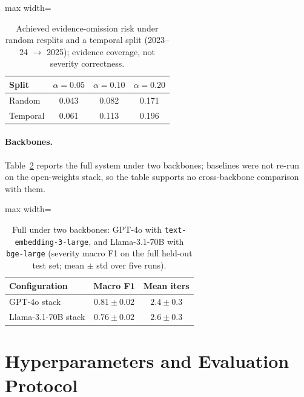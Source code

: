\begin{table}[h]
\centering
\small
\begin{adjustbox}{max width=\columnwidth}
\begin{tabular}{lccc}
\toprule
Split & $\alpha{=}0.05$ & $\alpha{=}0.10$ & $\alpha{=}0.20$ \\
\midrule
Random & 0.043 & 0.082 & 0.171 \\
Temporal & 0.061 & 0.113 & 0.196 \\
\bottomrule
\end{tabular}
\end{adjustbox}
\caption{Achieved evidence-omission risk under random resplits and a temporal split (2023--24 $\to$ 2025); evidence coverage, not severity correctness.}
\label{tab:risk_control_temporal}
\end{table}

\paragraph{Backbones.}
Table~\ref{tab:robustness} reports the full system under two backbones; baselines were not re-run on the open-weights stack, so the table supports no cross-backbone comparison with them.

\begin{table}[h]
\centering
\small
\begin{adjustbox}{max width=\columnwidth}
\begin{tabular}{lcc}
\toprule
Configuration & Macro F1 & Mean iters \\
\midrule
GPT-4o stack & $0.81 \pm 0.02$ & $2.4 \pm 0.3$ \\
Llama-3.1-70B stack & $0.76 \pm 0.02$ & $2.6 \pm 0.3$ \\
\bottomrule
\end{tabular}
\end{adjustbox}
\caption{Full \sysname{} under two backbones: GPT-4o with \texttt{text-embedding-3-large}, and Llama-3.1-70B with \texttt{bge-large} (severity macro F1 on the full held-out test set; mean $\pm$ std over five runs).}
\label{tab:robustness}
\end{table}

\section{Hyperparameters and Evaluation Protocol}
\label{app:repro}

